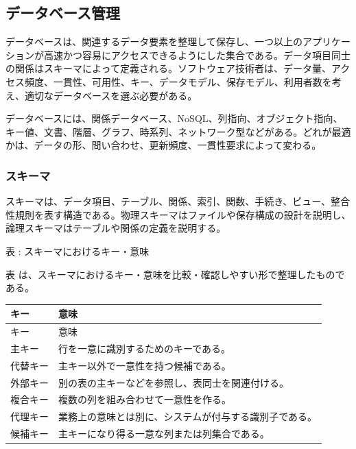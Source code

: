 \subsection{データベース管理}

データベースは、関連するデータ要素を整理して保存し、一つ以上のアプリケーションが高速かつ容易にアクセスできるようにした集合である。データ項目同士の関係はスキーマによって定義される。ソフトウェア技術者は、データ量、アクセス頻度、一貫性、可用性、キー、データモデル、保存モデル、利用者数を考え、適切なデータベースを選ぶ必要がある。

データベースには、関係データベース、NoSQL、列指向、オブジェクト指向、キー値、文書、階層、グラフ、時系列、ネットワーク型などがある。どれが最適かは、データの形、問い合わせ、更新頻度、一貫性要求によって変わる。

\subsubsection{スキーマ}

スキーマは、データ項目、テーブル、関係、索引、関数、手続き、ビュー、整合性規則を表す構造である。物理スキーマはファイルや保存構成の設計を説明し、論理スキーマはテーブルや関係の定義を説明する。

\par\smallskip\noindent{}\label{tab:ch16-17}表 \thetable: スキーマにおけるキー・意味\par\smallskip
表 \thetable は、スキーマにおけるキー・意味を比較・確認しやすい形で整理したものである。\par\smallskip
\begin{longtable}{>{\raggedright\arraybackslash}p{}>{\raggedright\arraybackslash}p{}}
\toprule
キー & 意味 \\
\midrule
\endfirsthead
\toprule
キー & 意味 \\
\midrule
\endhead
主キー & 行を一意に識別するためのキーである。 \\
代替キー & 主キー以外で一意性を持つ候補である。 \\
外部キー & 別の表の主キーなどを参照し、表同士を関連付ける。 \\
複合キー & 複数の列を組み合わせて一意性を作る。 \\
代理キー & 業務上の意味とは別に、システムが付与する識別子である。 \\
候補キー & 主キーになり得る一意な列または列集合である。 \\
\bottomrule
\end{longtable}

